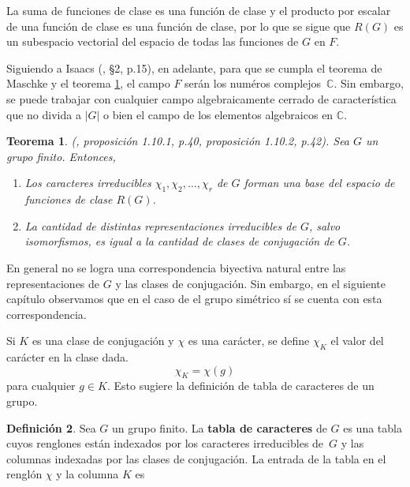 \documentclass[12pt]{book}
\newtheorem{theorem}{Teorema}[section]
\theoremstyle{definition}
\newtheorem{definition}[theorem]{Definición}
\newcounter{in}
\newcounter{ini}
\begin{document}
La suma de funciones de clase es una función de clase y el
producto por escalar de una función de clase es una función de clase,
por lo que se sigue que $R(G)$ es un subespacio vectorial del espacio
de todas las funciones de $G$ en $F$.

Siguiendo a Isaacs (\cite{isaacs}, \S 2, p.15), en adelante, para
que se cumpla el teorema de Maschke y el teorema \ref{no-rep-irr-no-cla-conj}, el campo $F$ serán
los numéros complejos~$\mathbb{C}$. Sin embargo, se puede trabajar
con cualquier campo algebraicamente cerrado de característica que no
divida a $|G|$ o bien el campo de los elementos algebraicos en $\mathbb{C}$.

\begin{theorem}{\normalfont (\cite{sagan2001symmetric}, proposición 1.10.1, p.40, proposición 1.10.2, p.42)}.
  \label{no-rep-irr-no-cla-conj}
  Sea $G$ un grupo finito. Entonces,
  \begin{enumerate}
  \item Los caracteres irreducibles
    $\chi_{1},\chi_{2},\ldots,\chi_{r}$ de $G$ forman una base del
    espacio de funciones de clase $R(G)$.
    \item La cantidad de distintas representaciones irreducibles de $G$, salvo
      isomorfismos, es igual a la cantidad de clases de conjugación de $G$.
  \end{enumerate}
\end{theorem}
En general no se logra una correspondencia biyectiva natural entre las
representaciones de $G$ y las clases de conjugación. Sin embargo, en
el siguiente capítulo observamos que en el caso de el grupo simétrico sí se cuenta con
esta correspondencia.

Si $K$ es una clase de conjugación y $\chi$ es una carácter, se define
$\chi_{K}$ el valor del carácter en la clase dada.
\begin{equation*}
  \chi_{K}=\chi(g)
\end{equation*}
para cualquier $g\in K$. Esto sugiere la definición de tabla de caracteres de
un grupo. 
\begin{definition}
  Sea $G$ un grupo finito. La \textbf{tabla de caracteres} de $G$ es
  una tabla cuyos renglones están indexados por los caracteres
  irreducibles de~$G$ y las columnas indexadas por las clases de
  conjugación. La entrada de la tabla en el renglón $\chi$ y la columna $K$ es
\end{definition}
\end{document}
